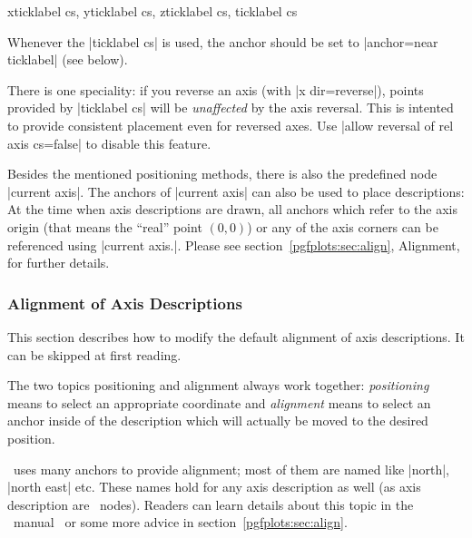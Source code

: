 \begin{coordinatesystemlist}{%
	xticklabel cs,%
	yticklabel cs,%
	zticklabel cs,
	ticklabel cs}
\begin{codeexample}[width=4cm]
\end{codeexample}

	Whenever the |ticklabel cs| is used, the anchor should be set to |anchor=near ticklabel| (see below).

	There is one speciality: if you reverse an axis (with |x dir=reverse|), points provided by |ticklabel cs| will be \emph{unaffected} by the axis reversal. This is intented to provide consistent placement even for reversed axes. Use |allow reversal of rel axis cs=false| to disable this feature.
\end{coordinatesystemlist}


Besides the mentioned positioning methods, there is also the predefined node |current axis|. The anchors of |current axis| can also be used to place descriptions: At the time when axis descriptions are drawn, all anchors which refer to the axis origin (that means the ``real'' point $(0,0)$) or any of the axis corners can be referenced using |current axis.|. Please see section~\ref{pgfplots:sec:align}, Alignment, for further details.

\subsubsection{Alignment of Axis Descriptions}
This section describes how to modify the default alignment of axis descriptions. It can be skipped at first reading.

The two topics positioning and alignment always work together: \emph{positioning} means to select an appropriate coordinate and \emph{alignment} means to select an anchor inside of the description which will actually be moved to the desired position.

\Tikz\ uses many anchors to provide alignment; most of them are named like |north|, |north east| etc. These names hold for any axis description as well (as axis description are \Tikz\ nodes). Readers can learn details about this topic in the \Tikz\ manual~\cite{tikz} or some more advice in section~\ref{pgfplots:sec:align}.

